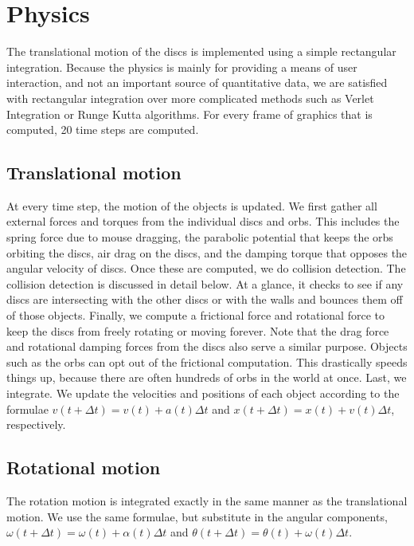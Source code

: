\documentclass[pdftext,twoside,10pt]{article}
\begin{document}
\vspace{1cm}


\section{Physics}
The translational motion of the discs is implemented using a simple rectangular integration. Because the physics is mainly for providing a means of user interaction, and not an important source of quantitative data, we are satisfied with rectangular integration over more complicated methods such as Verlet Integration or Runge Kutta algorithms. For every frame of graphics that is computed, 20 time steps are computed.

\subsection{Translational motion}
At every time step, the motion of the objects is updated. We first gather all external forces and torques from the individual discs and orbs. This includes the spring force due to mouse dragging, the parabolic potential that keeps the orbs orbiting the discs, air drag on the discs, and the damping torque that opposes the angular velocity of discs. Once these are computed, we do collision detection. The collision detection is discussed in detail below. At a glance, it checks to see if any discs are intersecting with the other discs or with the walls and bounces them off of those objects. Finally, we compute a frictional force and rotational force to keep the discs from freely rotating or moving forever. Note that the drag force and rotational damping forces from the discs also serve a similar purpose. Objects such as the orbs can opt out of the frictional computation. This drastically speeds things up, because there are often hundreds of orbs in the world at once. Last, we integrate. We update the velocities and positions of each object according to the formulae  $v(t + \Delta t) = v(t) + a(t)\Delta t$ and  $x(t + \Delta t) = x(t) + v(t)\Delta t$, respectively.

\subsection{Rotational motion}
The rotation motion is integrated exactly in the same manner as the translational motion. We use the same formulae, but substitute in the angular components, $\omega(t + \Delta t) = \omega(t) + \alpha(t)\Delta t$ and  $\theta(t + \Delta t) = \theta(t) + \omega(t)\Delta t$.
\end{document}
